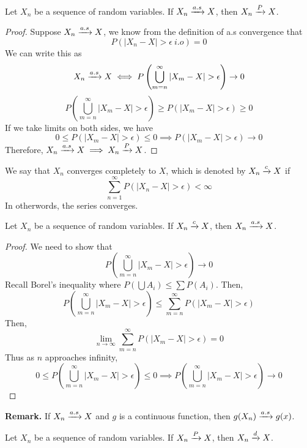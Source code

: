 \begin{theorem}
    Let $X_n$ be a sequence of random variables. If $X_n \xrightarrow{a.s} X$, then $X_n \xrightarrow{P} X$.
\end{theorem}
\begin{proof}
    Suppose $X_n \xrightarrow{a.s} X$, we know from the definition of a.s convergence that  
    \[P(|X_n - X| > \epsilon \ i.o) = 0\]
    We can write this as
    \[X_n \xrightarrow{a.s} X \iff P\left(\bigcup_{m=n}^\infty |X_m - X| > \epsilon\right) \rightarrow 0\]
    \[P\left(\bigcup_{m=n}^\infty |X_m - X| > \epsilon\right) \geq P(|X_m - X| > \epsilon) \geq 0\]
    If we take limits on both sides, we have 
    \[0 \leq P(|X_m - X| > \epsilon) \leq 0 \implies P(|X_m-X|>\epsilon) \rightarrow 0\]
    Therefore, $X_n \xrightarrow{a.s} X \implies X_n\xrightarrow{P} X$.     
\end{proof}
\begin{definition}
    We say that $X_n$ converges completely to $X$, which is denoted by $X_n \xrightarrow{c} X$ if 
    \[\sum_{n=1}^\infty P(|X_n -X| > \epsilon) < \infty\]
    In otherwords, the series converges. 
\end{definition}
\begin{theorem}
    Let $X_n$ be a sequence of random variables. If $X_n \xrightarrow{c} X$, then $X_n \xrightarrow{a.s} X$. 
\end{theorem}
\begin{proof}
    We need to show that 
    \[P\left(\bigcup_{m=n}^{\infty} |X_m - X| > \epsilon\right) \rightarrow 0\]
    Recall Borel's inequality where $P\left(\bigcup A_i\right) \leq \sum P(A_i)$. Then, 
    \[P\left(\bigcup_{m=n}^\infty |X_m - X| > \epsilon\right) \leq \sum_{m=n}^{\infty} P\left(|X_m - X| > \epsilon\right)\]
    Then, 
    \[\lim_{n\rightarrow \infty}\sum_{m=n}^{\infty} P\left(|X_m - X| > \epsilon\right) = 0\]
    Thus as $n$ approaches infinity, 
    \[0 \leq P\left(\bigcup_{m=n}^{\infty} |X_m - X| > \epsilon\right)\leq 0 \implies P\left(\bigcup_{m=n}^{\infty} |X_m - X| > \epsilon\right) \rightarrow 0\]
\end{proof}
\textbf{Remark.} If $X_n \xrightarrow{a.s} X$ and $g$ is a continuous function, then $g(X_n) \xrightarrow{a.s} g(x)$. 
\begin{theorem}
    Let $X_n$ be a sequence of random variables. If $X_n \xrightarrow{P} X$, then $X_n \xrightarrow{d} X$. 
\end{theorem}
